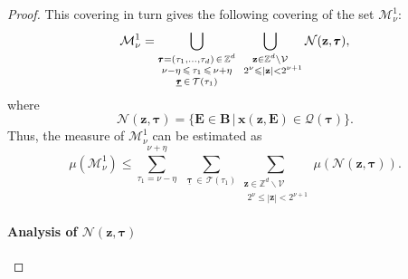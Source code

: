 \documentclass[a4paper,12pt]{article}
\theoremstyle{definition}
\theoremstyle{remark}
\theoremstyle{plain}
\renewcommand{\vec}[1]{\mathbf{#1}}
\renewcommand{\leq}{\leqslant}
\newcommand{\Z}{\mathbb{Z}}
\newcommand{\cM}{\mathcal{M}}
\newcommand{\cN}{\mathcal{N}}
\newcommand{\cQ}{\mathcal{Q}}
\newcommand{\cT}{\mathcal{T}}
\newcommand{\cV}{\mathcal{V}}
\newcommand{\bB}{\mathbf{B}}
\newcommand{\bE}{\mathbf{E}}
\begin{document}
\begin{proof}
  This covering in turn gives the following covering of the set $\cM^1_\nu$:
  \[
    \cM^1_\nu=
    \bigcup_{\substack{\pmb\tau=(\tau_1,\ldots,\tau_d)\,\in\,\Z^d \\ 
             \nu-\eta\,\leq\,\tau_1\,\leq\,\nu+\eta \vphantom{\frac11} \\ 
             \underline{\pmb\tau}\,\in\,\cT(\tau_1)}}
    \bigcup_{\substack{\vec z\in\Z^d\backslash\cV \\ 
             \,\ 2^\nu\leq|\vec z|<2^{\nu+1}}}
    \cN(\vec z,\pmb\tau),
  \]
  where
  \[
    \cN(\vec z,\pmb\tau)=
    \Big\{\bE\in\bB \,\Big|\, \vec x(\vec z,\bE)\in\cQ(\pmb\tau) \Big\}.
  \]
  Thus, the measure of $\cM^1_\nu$ can be estimated as
  \begin{equation}\label{eq:estimate_by_measure_of_N}
    \mu(\cM^1_\nu)\leq
    \sum_{\tau_1=\nu-\eta}^{\nu+\eta}\phantom{1}
    \sum_{\underline{\pmb\tau}\,\in\,\cT(\tau_1)}
    \sum_{\substack{\vec z\in\Z^d\backslash\cV \\ 
                    \,\ 2^\nu\leq|\vec z|<2^{\nu+1}}}
    \mu(\cN(\vec z,\pmb\tau)).
  \end{equation}
  
  \paragraph{\bf Analysis of $\cN(\vec z,\pmb\tau)$}
  

\end{proof}
\end{document}
